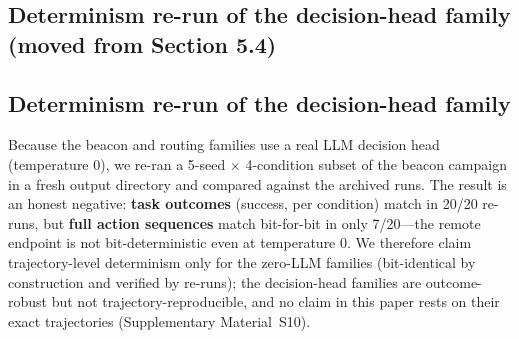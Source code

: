 \documentclass[10pt]{article}
\begin{document}
\subsection{Determinism re-run of the decision-head family (moved from Section 5.4)}
\subsection{Determinism re-run of the decision-head family}
\label{sec:res-rerun}
Because the beacon and routing families use a real LLM decision head (temperature 0), we re-ran a 5-seed $\times$ 4-condition subset of the beacon campaign in a fresh output directory and compared against the archived runs. The result is an honest negative: \textbf{task outcomes} (success, per condition) match in 20/20 re-runs, but \textbf{full action sequences} match bit-for-bit in only 7/20---the remote endpoint is not bit-deterministic even at temperature 0. We therefore claim trajectory-level determinism only for the zero-LLM families (bit-identical by construction and verified by re-runs); the decision-head families are outcome-robust but not trajectory-reproducible, and no claim in this paper rests on their exact trajectories (Supplementary Material~S10).
\end{document}
